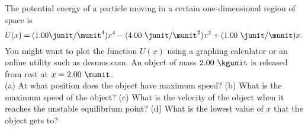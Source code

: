 The potential energy of a particle moving
in a certain one-dimensional region of space is
\begin{equation*}
  U(x) = (1.00 \junit/\munit^4) x^4 - (4.00\ \junit/\munit^2) x^2 + (1.00\ \junit/\munit) x.
\end{equation*}
You might want to plot the function $U(x)$ using
a graphing calculator or an online utility such as desmos.com.
An object of mass $2.00\ \kgunit$ is released from rest at
$x = 2.00\ \munit$. \\
%
(a) At what position does the object have maximum speed?\answercheck\hwendpart
%
(b) What is the maximum speed of the object?\answercheck\hwendpart
%
(c) What is the velocity of the object when it reaches the unstable equilibrium
point?\answercheck\hwendpart
%
(d) What is the lowest value of $x$ that the object gets to?\answercheck
